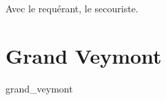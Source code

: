 

Avec  le requérant,  le secouriste.

\chapter{Grand Veymont}
\label{anx:retrans_grand_veymont}
{grand_veymont}










